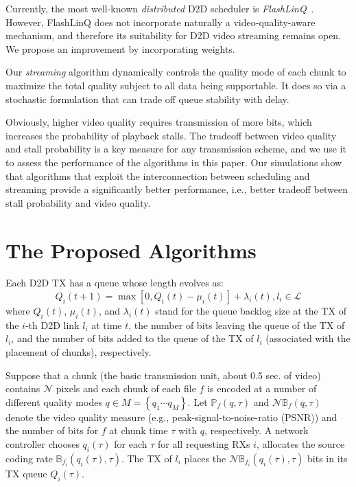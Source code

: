 \documentclass[journal]{IEEEtran}
\begin{document}
Currently, the most well-known \textit{distributed} D2D scheduler is \textit{FlashLinQ}~\cite{ton2013wu}.
However, FlashLinQ does not incorporate naturally a video-quality-aware mechanism, and therefore its suitability for D2D video streaming remains open.
We propose an improvement by incorporating weights.

Our \textit{streaming} algorithm dynamically controls the quality mode of each chunk to maximize the total quality subject to
    all data being supportable. It does so via a stochastic formulation that can trade off queue stability with delay.

Obviously, higher video quality requires transmission of more bits, which  increases the probability of playback stalls. The tradeoff between video quality and stall probability is a key measure for any transmission scheme, and we use it to assess the performance of the algorithms in this paper. Our simulations show that algorithms that exploit the interconnection between scheduling and streaming provide a significantly better performance, i.e., better tradeoff between stall probability and video quality.






\section{The Proposed Algorithms}
Each D2D TX has a queue whose length evolves as:
\begin{equation}
Q_{i}(t+1) = \max\left[0, Q_{i}(t) - \mu_{i}(t)\right] + \lambda_{i}(t), l_{i}\in\mathcal{L}
\label{eq:q}
\end{equation}
where $Q_{i}(t)$, $\mu_{i}(t)$, and $\lambda_{i}(t)$ stand for
    the queue backlog size at the TX of the $i$-th D2D link $l_{i}$ at time $t$,
    the number of bits leaving the queue of the TX of $l_{i}$,
    and the number of bits added to the queue of the TX of $l_{i}$ (associated with the placement of chunks), respectively.

Suppose that a chunk (the basic transmission unit, about 0.5 sec. of video) contains $\mathcal{N}$ pixels and each chunk of each file $f$ is encoded at a number of different quality modes $q \in M=\left\{q_{1}\cdots q_{M}\right\}$.
Let $\mathbb{P}_{f}(q, \tau)$ and $\mathcal{N}\mathbb{B}_{f}(q, \tau)$ denote
    the video quality measure (e.g., peak-signal-to-noise-ratio (PSNR))
    and the number of bits for $f$ at chunk time $\tau$ with $q$, respectively.
A network controller
    chooses $q_{i}(\tau)$ for each $\tau$ for all requesting RXs $i$,
    allocates the source coding rate $\mathbb{B}_{f_{i}}(q_{i}(\tau), \tau)$.
The TX of $l_{i}$ places the $\mathcal{N}\mathbb{B}_{f_{i}}(q_{i}(\tau), \tau)$ bits in its TX queue $Q_{i}(\tau)$.
\end{document}
